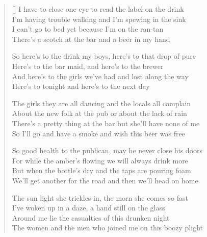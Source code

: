 \pagebreak
\settowidth{\versewidth}{Here's to the barmaid, and here's to the brewer.}
\begin{verse}[\versewidth]
I have to close one eye to read the label on the drink\\
I'm having trouble walking and I'm spewing in the sink\\
I can't go to bed yet because I'm on the ran-tan\\
There's a scotch at the bar and a beer in my hand


\begin{chorus}
So here’s to the drink my boys, here's to that drop of pure\\
Here's to the bar maid, and here's to the brewer\\
And here's to the girls we've had and lost along the way\\
Here's to tonight and here's to the next day
\end{chorus}

The girls they are all dancing and the locals all complain\\
About the new folk at the pub or about the lack of rain\\
There's a pretty thing at the bar but she'll have none of me\\
So I'll go and have a smoke and wish this beer was free


So good health to the publican, may he never close his doors\\
For while the amber's flowing we will always drink more\\
But when the bottle's dry and the taps are pouring foam\\
We'll get another for the road and then we'll head on home


The sun light she trickles in, the morn she comes so fast\\
I've woken up in a daze, a hand still on the glass\\
Around me lie the casualties of this drunken night\\
The women and the men who joined me on this boozy plight

\end{verse}
